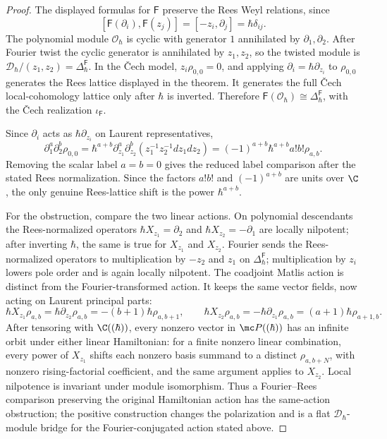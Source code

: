 \begin{proof}
  The displayed formulas for \(\mathsf F\) preserve the Rees Weyl
  relations, since
  \[
    [\mathsf F(\partial_i),\mathsf F(z_j)]
      =[-z_i,\partial_j]=\hbar\delta_{ij}.
  \]
  The polynomial module \(\mathcal O_\hbar\) is cyclic with generator
  \(1\) annihilated by \(\partial_1,\partial_2\).  After Fourier twist
  the cyclic generator is annihilated by \(z_1,z_2\), so the twisted
  module is \(\mathcal D_\hbar/(z_1,z_2)=\Delta^{\mathsf F}_\hbar\).
  In the \v{C}ech model, \(z_i\rho_{0,0}=0\), and applying
  \(\partial_i=\hbar\partial_{z_i}\) to \(\rho_{0,0}\) generates the
  Rees lattice displayed in the theorem.  It generates the full
  \v{C}ech local-cohomology lattice only after \(\hbar\) is inverted.
  Therefore
  \(\mathsf F(\mathcal O_\hbar)\cong\Delta^{\mathsf F}_\hbar\), with the
  \v{C}ech realization \(\iota_{\mathsf F}\).

  Since \(\partial_i\) acts as \(\hbar\partial_{z_i}\) on Laurent
  representatives,
  \[
    \partial_1^a\partial_2^b\rho_{0,0}
    =
    \hbar^{a+b}
    \partial_{z_1}^a\partial_{z_2}^b
      (z_1^{-1}z_2^{-1}dz_1dz_2)
    =
    (-1)^{a+b}\hbar^{a+b}a!b!\rho_{a,b}.
  \]
  Removing the scalar label \(a=b=0\) gives the reduced label comparison
  after the stated Rees normalization.  Since the factors \(a!b!\) and
  \((-1)^{a+b}\) are units over \(\C\), the only genuine Rees-lattice
  shift is the power \(\hbar^{a+b}\).

  For the obstruction, compare the two linear actions.  On polynomial
  descendants the Rees-normalized operators
  \(\hbar X_{z_1}=\partial_2\) and
  \(\hbar X_{z_2}=-\partial_1\) are locally nilpotent; after inverting
  \(\hbar\), the same is true for \(X_{z_1}\) and \(X_{z_2}\).  Fourier
  sends the Rees-normalized operators to multiplication by \(-z_2\) and
  \(z_1\) on \(\Delta^{\mathsf F}_\hbar\); multiplication by \(z_i\)
  lowers pole order and is again locally nilpotent.  The coadjoint
  Matlis action is distinct from the Fourier-transformed action.  It keeps the
  same vector fields, now acting on Laurent principal parts:
  \[
    \hbar X_{z_1}\rho_{a,b}
      =\hbar\partial_{z_2}\rho_{a,b}
      =-(b+1)\hbar\rho_{a,b+1},\qquad
    \hbar X_{z_2}\rho_{a,b}
      =-\hbar\partial_{z_1}\rho_{a,b}
      =(a+1)\hbar\rho_{a+1,b}.
  \]
  After tensoring with \(\C((\hbar))\), every nonzero vector in
  \(\mc P((\hbar))\) has an infinite orbit under either linear
  Hamiltonian: for a finite nonzero linear combination, every power of
  \(X_{z_1}\) shifts each nonzero basis summand to a distinct
  \(\rho_{a,b+N}\), with nonzero rising-factorial coefficient, and the
  same argument applies to \(X_{z_2}\).  Local nilpotence is invariant
  under module isomorphism.
  Thus a Fourier--Rees comparison preserving the original Hamiltonian
  action has the same-action obstruction; the positive construction
  changes the polarization and is a flat \( \mathcal D_\hbar \)-module
  bridge for the Fourier-conjugated action stated above.
\end{proof}

